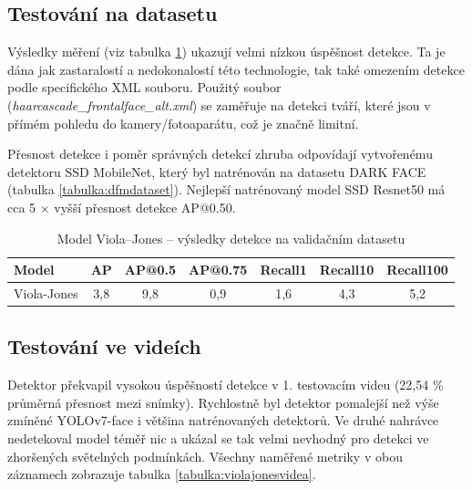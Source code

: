 \subsection*{Testování na datasetu}
Výsledky měření (viz tabulka \ref{tabulka:violajones}) ukazují velmi nízkou úspěšnost detekce. Ta je dána jak zastaralostí a nedokonalostí této technologie, tak také omezením detekce podle specifického XML souboru. Použitý soubor (\emph{haarcascade\_frontalface\_alt.xml}) se zaměřuje na detekci tváří, které jsou v přímém pohledu do kamery/fotoaparátu, což je značně limitní. 

Přesnost detekce i poměr správných detekcí zhruba odpovídají vytvořenému detektoru SSD MobileNet, který byl natrénován na datasetu DARK FACE (tabulka \ref{tabulka:dfmdataset}). Nejlepší natrénovaný model SSD Resnet50 má cca 5 $\times$ vyšší přesnost detekce AP@0.50.

\begin{table}[H]
  \begin{center}
    \begin{tabular}{|l|c|c|c|c|c|c|}
    \hline
    \rowcolor[HTML]{E0DBDB} 
    \textbf{Model}                      & \textbf{AP} & \textbf{AP@0.5} & \textbf{AP@0.75} & \textbf{Recall1} & \textbf{Recall10} & \textbf{Recall100} \\ \hline
    \cellcolor[HTML]{E0DBDB}Viola-Jones & 3,8         & 9,8             & 0,9              & 1,6              & 4,3               & 5,2                \\ \hline
    \end{tabular}
    \label{tabulka:violajones}
    \caption{Model Viola--Jones -- výsledky detekce na validačním datasetu}
  \end{center}
\end{table}

\subsection*{Testování ve videích}
Detektor překvapil vysokou úspěšností detekce v 1. testovacím videu (22,54 \% průměrná přesnost mezi snímky). Rychlostně byl detektor pomalejší než výše zmíněné YOLOv7-face i většina natrénovaných detektorů. Ve druhé nahrávce nedetekoval model téměř nic a ukázal se tak velmi nevhodný pro detekci ve zhoršených světelných podmínkách. Všechny naměřené metriky v obou záznamech zobrazuje tabulka \ref{tabulka:violajonesvidea}.

